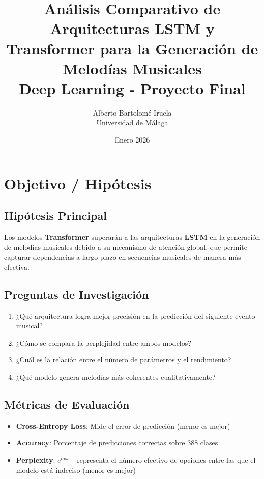 \documentclass[12pt,a4paper]{article}
\begin{document}
\title{\textbf{Análisis Comparativo de Arquitecturas LSTM y Transformer para la Generación de Melodías Musicales}\\[1em]
\large Deep Learning - Proyecto Final}
\author{Alberto Bartolomé Iruela\\Universidad de Málaga}
\date{Enero 2026}
\maketitle

\tableofcontents
\newpage

\section{Objetivo / Hipótesis}

\subsection{Hipótesis Principal}
Los modelos \textbf{Transformer} superarán a las arquitecturas \textbf{LSTM} en la generación de melodías musicales debido a su mecanismo de atención global, que permite capturar dependencias a largo plazo en secuencias musicales de manera más efectiva.

\subsection{Preguntas de Investigación}
\begin{enumerate}
    \item ¿Qué arquitectura logra mejor precisión en la predicción del siguiente evento musical?
    \item ¿Cómo se compara la perplejidad entre ambos modelos?
    \item ¿Cuál es la relación entre el número de parámetros y el rendimiento?
    \item ¿Qué modelo genera melodías más coherentes cualitativamente?
\end{enumerate}

\subsection{Métricas de Evaluación}
\begin{itemize}
    \item \textbf{Cross-Entropy Loss}: Mide el error de predicción (menor es mejor)
    \item \textbf{Accuracy}: Porcentaje de predicciones correctas sobre 388 clases
    \item \textbf{Perplexity}: $e^{loss}$ - representa el número efectivo de opciones entre las que el modelo está indeciso (menor es mejor)
\end{itemize}
\end{document}
